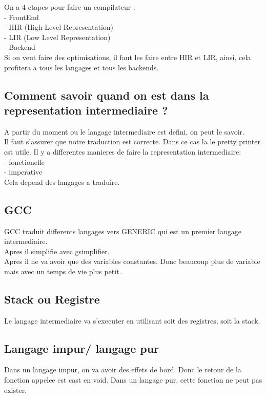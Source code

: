 \documentclass[a4paper,11pt]{article}
\begin{document}
On a 4 etapes pour faire un compilateur :\\
- FrontEnd\\
- HIR (High Level Representation)\\
- LIR (Low Level Representation)\\
- Backend\\

Si on veut faire des optimisations, il faut les faire entre HIR et LIR, ainsi, cela profitera a tous les langages et tous les backends.\\

\subsection{Comment savoir quand on est dans la representation intermediaire ?}
A  partir du moment ou le langage intermediaire est defini, on peut le savoir.\\
Il faut s'assurer que notre traduction est correcte. Dans ce cas la le pretty printer est utile.
Il y  a differentes manieres de faire la representation intermediaire:\\
- fonctionelle\\
- imperative\\

Cela depend des langages a traduire.

\subsection{GCC}\hfill \break
GCC traduit differents langages vers GENERIC qui est un premier langage intermediaire.\\
Apres il simplifie avec gsimplifier.\\
Apres il ne va avoir que des variables constantes. Donc beaucoup plus de variable mais avec un temps de vie plus petit.\\

\subsection{Stack ou Registre}
Le langage intermediaire va s'executer en utilisant soit des registres, soit la stack.

\subsection{Langage impur/ langage pur}
Dans un langage impur, on va avoir des effets de bord. Donc le retour de la fonction appelee est cast en void.
Dans un langage pur, cette fonction ne peut pas exister.
\end{document}
